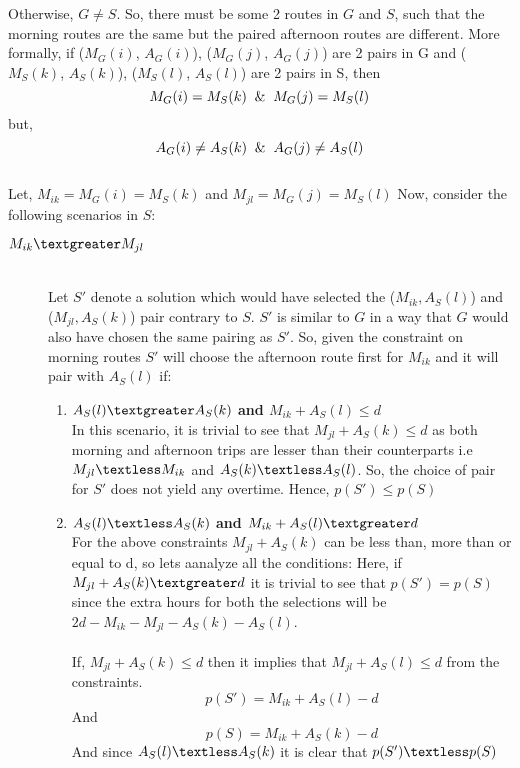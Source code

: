 \documentclass[8pt]{article}
\begin{document}
Otherwise, $G \neq S$. So, there must be some 2 routes in $G$ and $S$, such that the morning routes are the same but the paired afternoon routes are different. More formally, if ($M_G(i)$, $A_G(i)$), ($M_G(j)$, $A_G(j)$) are 2 pairs in G and ($M_S(k)$, $A_S(k)$), ($M_S(l)$, $A_S(l)$) are 2 pairs in S, then
$$M_G(i) = M_S(k) \And M_G(j) = M_S(l)$$
but,
$$A_G(i) \neq A_S(k) \And A_G(j) \neq A_S(l)$$ \\
Let, $M_{ik} = M_G(i) = M_S(k)$ and $M_{jl} = M_G(j) = M_S(l)$
Now, consider the following scenarios in $S$:
\begin{description}
    \item[$M_{ik} \textgreater M_{jl}$] \hfill \\
        Let $S'$ denote a solution which would have selected the ($M_{ik}, A_S(l)$) and ($M_{jl}, A_S(k)$) pair contrary to $S$. $S'$ is similar to $G$ in a way that $G$ would also have chosen the same pairing as $S'$. So, given the constraint on morning routes $S'$ will choose the afternoon route first for $M_{ik}$ and it will pair with $A_S(l)$ if:

    \begin{enumerate}
        \item \textbf{$A_S(l) \textgreater A_S(k)$ and $M_{ik} + A_S(l) \leq d$} \hfill \\
            In this scenario, it is trivial to see that $M_{jl} + A_S(k) \leq d$ as both morning and afternoon trips are lesser than their counterparts i.e $M_{jl} \textless M_{ik}$ and $A_S(k) \textless A_S(l)$. So, the choice of pair for $S'$ does not yield any overtime. Hence, $p(S') \leq p(S)$ \\

        \item \textbf{$A_S(l) \textless A_S(k)$ and $M_{ik} + A_S(l) \textgreater d$} \hfill \\
            For the above constraints $M_{jl} + A_S(k)$ can be less than, more than or equal to d, so lets aanalyze all the conditions:
            Here, if $M_{jl} + A_S(k) \textgreater d$ it is trivial to see that $p(S') = p(S)$ since the extra hours for both the selections will be $2d - M_{ik} - M_{jl} - A_S(k) - A_S(l)$. \\ \\
            If, $M_{jl} + A_S(k) \leq d$ then it implies that $M_{jl} + A_S(l) \leq d$ from the constraints. $$p(S') =  M_{ik} + A_S(l) - d$$ And $$p(S) = M_{ik} + A_S(k) - d$$
            And since $A_S(l) \textless A_S(k)$ it is clear that $p(S') \textless p(S)$
    \end{enumerate}
\end{description}
\end{document}
